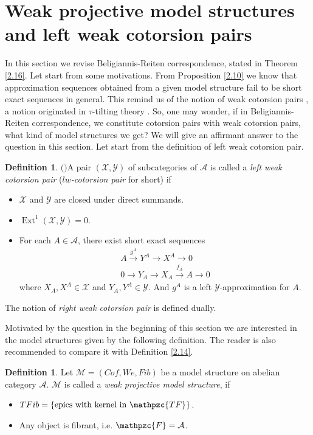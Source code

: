 \documentclass[12pt]{amsart}
\numberwithin{equation}{section}
\theoremstyle{definition}
\newtheorem{definition}[lemma]{Definition}
\DeclareMathOperator{\Ext}{Ext}
\newtheorem*{theorem 0*}{Theorem}
\newtheorem*{theorem a*}{Theorem A}
\newtheorem*{theorem b*}{Theorem B}
\numberwithin{diagram}{section}
\begin{document}
	
\section{Weak projective model structures and left weak cotorsion pairs}
In this section we revise Beligiannis-Reiten correspondence, stated in Theorem \ref{2.16}.
Let start from some motivations.
From Proposition \ref{2.10} we know that approximation sequences obtained from a given model structure fail to be short exact sequences in general. This remind us of the notion of weak cotorsion pairs \cite{BZ}, a notion originated in $\tau$-tilting theory \cite{AIR}.
So, one may wonder, if in Beligiannis-Reiten correspondence, we constitute cotorsion pairs with weak cotorsion pairs, what kind of model structures we get?
We will give an affirmant answer to the question in this section. Let start from the definition of left weak cotorsion pair.

\begin{definition}$($\cite{BZ}$)$\label{3.1}
A pair $(\mathcal{X},\mathcal{Y})$ of subcategories of $\mathcal{A}$ is called a {\it left weak cotorsion pair} ({\it $lw$-cotorsion pair} for short) if
    \begin{itemize}
    \item[(1)]
    $\mathcal{X}$ and $\mathcal{Y}$ are closed under direct summands. 
    \item[(2)]
    $\Ext^1(\mathcal{X},\mathcal{Y})=0$.
    \item[(3)]
    For each $A\in \mathcal{A}$, there exist short exact sequences
    \begin{align}
     A\overset{g^A}{\longrightarrow} Y^A\longrightarrow X^A\rightarrow 0\label{eq3.1}\\
    0\rightarrow Y_A\longrightarrow X_A\overset{f_A}{\longrightarrow} A\rightarrow\label{eq3.2} 0
    \end{align}
    where $X_A,X^A\in \mathcal{X}$ and $Y_A,Y^A\in \mathcal{Y}$. And $g^A$ is a left $\mathcal{Y}$-approximation for $A$. 
\end{itemize}
The notion of {\it right weak cotorsion pair} is defined dually. 
\end{definition}

Motivated by the question in the beginning of this section we are interested in the model structures given by the following definition. The reader is also recommended to compare it with Definition \ref{2.14}.
\begin{definition}\label{3.2}
	Let $\mathcal{M}=(Cof,We,Fib)$ be a model structure on abelian category $\mathcal{A}$.
	$\mathcal{M}$ is called a {\it weak projective model structure}, if
	     \begin{itemize}
	     \item[(1)]
	     $TFib=\{\text{epics with kernel in }\mathpzc{TF}\}$.
	     \item[(2)]
	     Any object is fibrant, i.e. $\mathpzc{F}=\mathcal{A}$.
	     \end{itemize}
	\end{definition}
\end{document}
